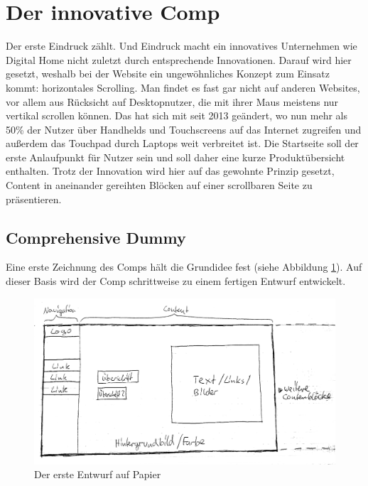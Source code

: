 \section{Der innovative Comp}
Der erste Eindruck zählt. Und Eindruck macht ein innovatives Unternehmen wie Digital Home nicht zuletzt durch entsprechende Innovationen.
Darauf wird hier gesetzt, weshalb bei der Website ein ungewöhnliches Konzept zum Einsatz kommt: horizontales Scrolling. Man findet es fast gar nicht auf anderen Websites, vor allem aus Rücksicht auf Desktopnutzer, die mit ihrer Maus meistens nur vertikal scrollen können. Das hat sich mit seit 2013 geändert, wo nun mehr als 50\% der Nutzer über Handhelds und Touchscreens auf das Internet zugreifen und außerdem das Touchpad durch Laptops weit verbreitet ist.
Die Startseite soll der erste Anlaufpunkt für Nutzer sein und soll daher eine kurze Produktübersicht enthalten. Trotz der Innovation wird hier auf das gewohnte
Prinzip gesetzt, Content in aneinander gereihten Blöcken auf einer scrollbaren Seite zu präsentieren.

	\subsection{Comprehensive Dummy}

Eine erste Zeichnung des Comps hält die Grundidee fest (siehe Abbildung \ref{inno_Comp1}). Auf dieser Basis wird der Comp schrittweise zu einem fertigen Entwurf entwickelt.

\begin{figure} [hp]
\includegraphics[width=\textwidth]{./img/inno_comp1.png}
\caption{Der erste Entwurf auf Papier}
\label{inno_Comp1}
\end{figure}
